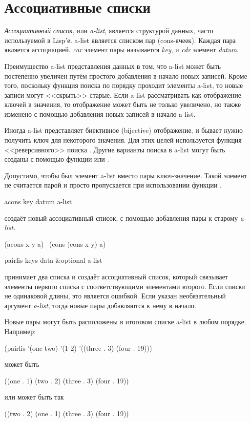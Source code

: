 \section{Ассоциативные списки}

\emph{Ассоциативный список}, или \emph{a-list}, является структурой данных,
часто используемой в Lisp'е. a-list является списком пар (cons-ячеек). Каждая
пара является ассоциацией. \emph{car} элемент пары называется \emph{key}, и
\emph{cdr} элемент \emph{datum}.

Преимущество a-list представления данных в том, что a-list может быть
постепенно увеличен путём простого добавления в начало новых записей.
Кроме того, поскольку функция поиска  по порядку проходит элементы
a-list, то новые записи могут <<скрыть>> старые. Если a-list
рассматривать как отображение ключей в значения, то отображение может быть не
только увеличено, но также изменено с помощью добавления новых записей в начало
a-list.

Иногда a-list представляет биективное (bijective) отображение, и бывает нужно
получить ключ для некоторого значения. Для этих целей используется функция
<<реверсивного>> поиска . Другие варианты поиска в a-list могут быть
созданы с помощью функции  или .

Допустимо, чтобы {\false} был элемент a-list вместо пары ключ-значение.
Такой элемент не считается парой и просто пропускается при использовании
функции .

\begin{defun}[Функция]
acons key datum a-list

 создаёт новый ассоциативный список, с помощью добавления пары
 к старому \emph{a-list}.
\begin{lisp}
(acons x y a) \EQ\ (cons (cons x y) a)
\end{lisp}
\end{defun}

\begin{defun}[Функция]
pairlis keys data &optional a-list

 принимает два списка и создаёт ассоциативный список, который
связывает элементы первого списка с соответствующими элементами второго. Если
списки не одинаковой длины, это является ошибкой. Если указан необязательный
аргумент \emph{a-list}, тогда новые пары добавляются к нему в начало.

Новые пары могут быть расположены в итоговом списке a-list в любом порядке.
Например:
\begin{lisp}
(pairlis '(one two) '(1 2) '((three . 3) (four . 19)))
\end{lisp}
может быть
\begin{lisp}
((one . 1) (two . 2) (three . 3) (four . 19))
\end{lisp}
или может быть так
\begin{lisp}
((two . 2) (one . 1) (three . 3) (four . 19))
\end{lisp}
\end{defun}

